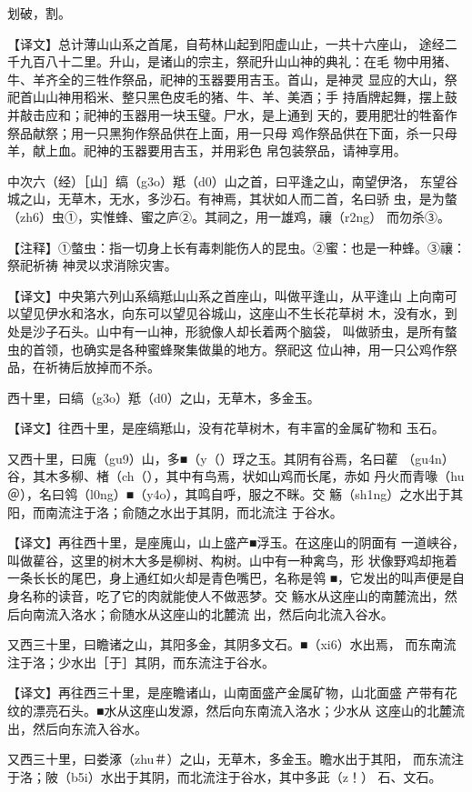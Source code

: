 \documentclass[a4paper,12pt,UTF8,twoside]{ctexbook}
\begin{document}
划破，割。

【译文】总计薄山山系之首尾，自苟林山起到阳虚山止，一共十六座山， 途经二千九百八十二里。升山，是诸山的宗主，祭祀升山山神的典礼：在毛 物中用猪、牛、羊齐全的三牲作祭品，祀神的玉器要用吉玉。首山，是神灵 显应的大山，祭祀首山山神用稻米、整只黑色皮毛的猪、牛、羊、美酒；手 持盾牌起舞，摆上鼓并敲击应和；祀神的玉器用一块玉璧。尸水，是上通到 天的，要用肥壮的牲畜作祭品献祭；用一只黑狗作祭品供在上面，用一只母 鸡作祭品供在下面，杀一只母羊，献上血。祀神的玉器要用吉玉，并用彩色 帛包装祭品，请神享用。

中次六（经）［山］缟（g3o）羝（d0）山之首，曰平逢之山，南望伊洛， 东望谷城之山，无草木，无水，多沙石。有神焉，其状如人而二首，名曰骄 虫，是为螫（zh6）虫①，实惟蜂、蜜之庐②。其祠之，用一雄鸡，禳（r2ng） 而勿杀③。

【注释】①螫虫：指一切身上长有毒刺能伤人的昆虫。②蜜：也是一种蜂。③禳：祭祀祈祷 神灵以求消除灾害。

【译文】中央第六列山系缟羝山山系之首座山，叫做平逢山，从平逢山 上向南可以望见伊水和洛水，向东可以望见谷城山，这座山不生长花草树 木，没有水，到处是沙子石头。山中有一山神，形貌像人却长着两个脑袋， 叫做骄虫，是所有螫虫的首领，也确实是各种蜜蜂聚集做巢的地方。祭祀这 位山神，用一只公鸡作祭品，在祈祷后放掉而不杀。

西十里，曰缟（g3o）羝（d0）之山，无草木，多金玉。

【译文】往西十里，是座缟羝山，没有花草树木，有丰富的金属矿物和 玉石。

又西十里，曰廆（gu9）山，多■（y（）琈之玉。其阴有谷焉，名曰雚 （gu4n）谷，其木多柳、楮（ch（），其中有鸟焉，状如山鸡而长尾，赤如 丹火而青喙（hu＠），名曰鸰（l0ng）■（y4o），其鸣自呼，服之不眯。交 觞（sh1ng）之水出于其阳，而南流注于洛；俞随之水出于其阴，而北流注 于谷水。

【译文】再往西十里，是座廆山，山上盛产■浮玉。在这座山的阴面有 一道峡谷，叫做雚谷，这里的树木大多是柳树、构树。山中有一种禽鸟，形 状像野鸡却拖着一条长长的尾巴，身上通红如火却是青色嘴巴，名称是鸰 ■，它发出的叫声便是自身名称的读音，吃了它的肉就能使人不做恶梦。交 觞水从这座山的南麓流出，然后向南流入洛水；俞随水从这座山的北麓流 出，然后向北流入谷水。

又西三十里，曰瞻诸之山，其阳多金，其阴多文石。■（xi6）水出焉， 而东南流注于洛；少水出［于］其阴，而东流注于谷水。

【译文】再往西三十里，是座瞻诸山，山南面盛产金属矿物，山北面盛 产带有花纹的漂亮石头。■水从这座山发源，然后向东南流入洛水；少水从 这座山的北麓流出，然后向东流入谷水。

又西三十里，曰娄涿（zhu＃）之山，无草木，多金玉。瞻水出于其阳， 而东流注于洛；陂（b5i）水出于其阴，而北流注于谷水，其中多茈（z！） 石、文石。
\end{document}
